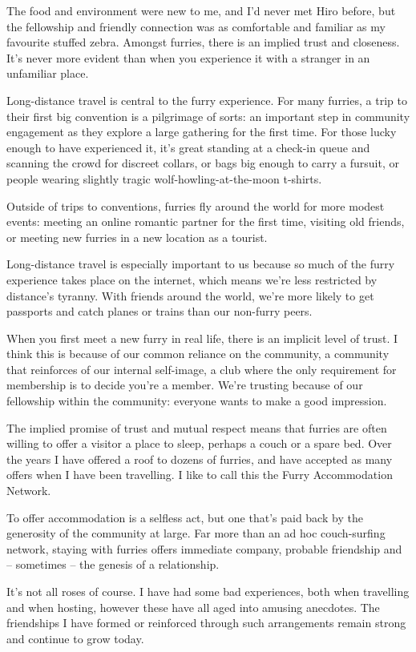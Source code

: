 The food and environment were new to me, and I'd never met Hiro before, but the fellowship and friendly connection was as comfortable and familiar as my favourite stuffed zebra. Amongst furries, there is an implied trust and closeness. It's never more evident than when you experience it with a stranger in an unfamiliar place.

Long-distance travel is central to the furry experience. For many furries, a trip to their first big convention is a pilgrimage of sorts: an important step in community engagement as they explore a large gathering for the first time. For those lucky enough to have experienced it, it's great standing at a check-in queue and scanning the crowd for discreet collars, or bags big enough to carry a fursuit, or people wearing slightly tragic wolf-howling-at-the-moon t-shirts.

Outside of trips to conventions, furries fly around the world for more modest events: meeting an online romantic partner for the first time, visiting old friends, or meeting new furries in a new location as a tourist.

Long-distance travel is especially important to us because so much of the furry experience takes place on the internet, which means we're less restricted by distance's tyranny. With friends around the world, we're more likely to get passports and catch planes or trains than our non-furry peers.

When you first meet a new furry in real life, there is an implicit level of trust. I think this is because of our common reliance on the community, a community that reinforces of our internal self-image, a club where the only requirement for membership is to decide you're a member. We're trusting because of our fellowship within the community: everyone wants to make a good impression.

The implied promise of trust and mutual respect means that furries are often willing to offer a visitor a place to sleep, perhaps a couch or a spare bed. Over the years I have offered a roof to dozens of furries, and have accepted as many offers when I have been travelling. I like to call this the Furry Accommodation Network.

To offer accommodation is a selfless act, but one that's paid back by the generosity of the community at large. Far more than an ad hoc couch-surfing network, staying with furries offers immediate company, probable friendship and -- sometimes -- the genesis of a relationship.

It's not all roses of course. I have had some bad experiences, both when travelling and when hosting, however these have all aged into amusing anecdotes. The friendships I have formed or reinforced through such arrangements remain strong and continue to grow today.

